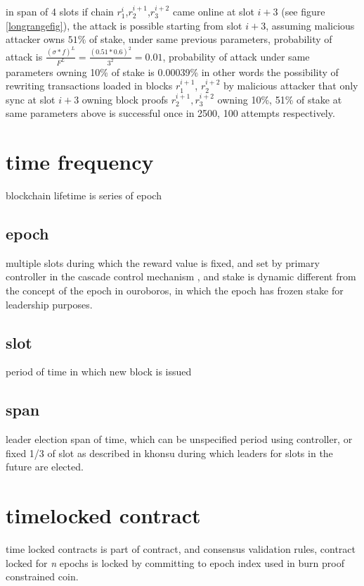 \documentclass{article}
\begin{document}
\item in span of 4 slots if chain $r^i_1$,$r^{i+1}_2$,$r^{i+2}_3$ came online at slot $i+3$ (see figure \ref{longrangefig}), the attack is possible starting from slot $i+3$, assuming malicious attacker owns $51\%$ of stake, under same previous parameters, probability of attack is $\frac{(\sigma*f)^L}{F^L} = \frac{(0.51*0.6)^2}{3^2} = 0.01$, probability of attack under same parameters owning 10\% of stake is 0.00039\% in other words the possibility of rewriting transactions loaded in blocks $r^{i+1}_1$, $r^{i+2}_2$ by malicious attacker that only sync at slot $i+3$ owning block proofs $r^{i+1}_2,r^{i+2}_3$ owning 10\%, 51\% of stake at same parameters above is successful once in 2500, 100 attempts respectively.


\section {time frequency}
blockchain lifetime is series of epoch


\subsection {epoch}
multiple slots during which the reward value is fixed, and set by primary controller in the cascade control mechanism \cite{cascade}, and stake is dynamic different from the concept of the epoch in ouroboros, in which the epoch has frozen stake for leadership purposes.

\subsection {slot}
period of time in which new block is issued

\subsection {span}
leader election span of time, which can be unspecified period using controller, or fixed 1/3 of slot as described in khonsu \cite{khonsu} during which leaders for slots in the future are elected.

\section {timelocked contract}
time locked contracts is part of contract, and consensus validation rules, contract locked for \emph{n} epochs is locked by committing to epoch index used in burn proof constrained coin.
\end{document}
